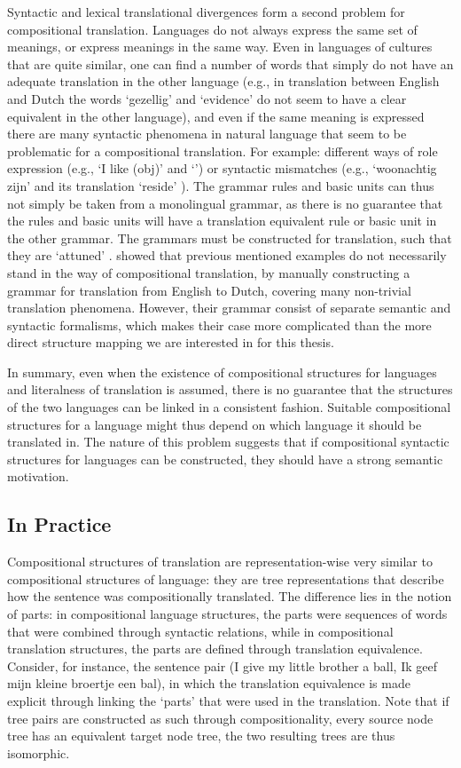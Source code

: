 \documentclass{report}
\begin{document}
Syntactic and lexical translational divergences form a second problem for compositional translation. Languages do not always express the same set of meanings, or express meanings in the same way. Even in languages of cultures that are quite similar, one can find a number of words that simply do not have an adequate translation in the other language (e.g., in translation between English and Dutch the words `gezellig' and `evidence' do not seem to have a clear equivalent in the other language), and even if the same meaning is expressed there are many syntactic phenomena in natural language that seem to be problematic for a compositional translation.  For example: different ways of role expression (e.g., `I like (obj)' and `') or syntactic mismatches (e.g., `woonachtig zijn' and its translation `reside' \citep{landsbergen1989power}).  The grammar rules and basic units can thus not simply be taken from a monolingual grammar, as there is no guarantee that the rules and basic units will have a translation equivalent rule or basic unit in the other grammar. The grammars must be constructed for translation, such that they are `attuned' \citep{rosetta1994compositional}. \cite{rosetta1994compositional} showed that previous mentioned examples do not necessarily stand in the way of compositional translation, by manually constructing a grammar for translation from English to Dutch, covering many non-trivial translation phenomena. However, their grammar consist of separate semantic and syntactic formalisms, which makes their case more complicated than the more direct structure mapping we are interested in for this thesis.

In summary, even when the existence of compositional structures for languages and literalness of translation is assumed, there is no guarantee that the structures of the two languages can be linked in a consistent fashion. Suitable compositional structures for a language might thus depend on which language it should be translated in. The nature of this problem suggests that if compositional syntactic structures for languages  can be constructed, they should have a strong semantic motivation.

\subsection{In Practice}

Compositional structures of translation are representation-wise very similar to compositional structures of language: they are tree representations that describe how the sentence was compositionally translated. The difference lies in the notion of parts: in compositional language structures, the parts were sequences of words that were combined through syntactic relations, while in compositional translation structures, the parts are defined through translation equivalence. Consider, for instance, the sentence pair (I give my little brother a ball, Ik geef mijn kleine broertje een bal), in which the translation equivalence is made explicit through linking the `parts' that were used in the translation. Note that if tree pairs are constructed as such through compositionality, every source node tree has an equivalent target node tree, the two resulting trees are thus isomorphic.
\end{document}
